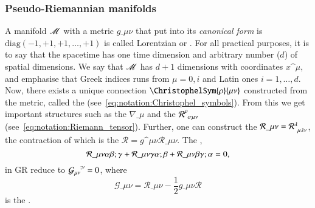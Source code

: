 \subsubsection{Pseudo-Riemannian manifolds}
A manifold $\mathscr{M}$ with a metric $g\_{\mu\nu}$ that put into its \emph{canonical form} is $\text{diag}(-1,+1,+1, \dots,+1)$ is called Lorentzian or . For all practical purposes, it is to say that the spacetime has one time dimension and arbitrary number ($d$) of spatial dimensions. We say that $\mathscr{M}$ has $d+1$ dimensions with coordinates $x\^\mu$, and emphasise that Greek indices runs from $\mu=0,i$ and Latin ones $i = 1, \dots , d$. Now, there exists a unique connection $\ChristophelSym{\rho}{\mu\nu}$ constructed from the metric, called the  (see~\cref{eq:notation:Christophel_symbols}). From this we get important structures such as the  $\nabla\_\mu$ and the  $\mathcal{R}\indices{^\rho_{\sigma\mu\nu}}$ (see~\cref{eq:notation:Riemann_tensor}). Further, one can construct the  $\mathcal{R}\_{\mu\nu}  = \mathcal{R}\indices{^\lambda_{\mu\lambda\nu}}$, 
the contraction of which is the  $\mathcal{R}= g\^{\mu\nu} \mathcal{R}\_{\mu\nu}$. 
The ,
\begin{equation}\label{eq:GR:diffgeo:Bianchi_identities}
    \mathcal{R}\_{\mu\nu\alpha\beta;\gamma} + 
    \mathcal{R}\_{\mu\nu\gamma\alpha;\beta} + 
    \mathcal{R}\_{\mu\nu\beta\gamma;\alpha} = 0,
\end{equation}
in GR reduce to %
$\mathcal{G}\indices{_{\mu\nu}^{;\nu}}=0$, where %
\begin{equation}\label{eq:GR:diffgeo:Einstein_tensor}
    \mathcal{G}\_{\mu\nu}= \mathcal{R}\_{\mu\nu} - \frac{1}{2} g\_{\mu\nu}  \mathcal{R}
\end{equation}
is the . 




